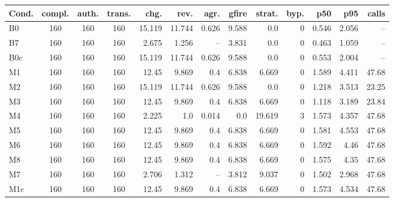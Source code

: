 \begin{tabular}{lcccrrrrrrrrr}
\toprule
Cond. & compl. & auth. & trans. & chg. & rev. & agr. & gfire & strat. & byp. & p50 & p95 & calls\\
\midrule
B0 & 160 & 160 & 160 & 15.119 & 11.744 & 0.626 & 9.588 & 0.0 & 0 & 0.546 & 2.056 & -- \\
B7 & 160 & 160 & 160 & 2.675 & 1.256 & -- & 3.831 & 0.0 & 0 & 0.463 & 1.059 & -- \\
B0c & 160 & 160 & 160 & 15.119 & 11.744 & 0.626 & 9.588 & 0.0 & 0 & 0.553 & 2.004 & -- \\
M1 & 160 & 160 & 160 & 12.45 & 9.869 & 0.4 & 6.838 & 6.669 & 0 & 1.589 & 4.411 & 47.68 \\
M2 & 160 & 160 & 160 & 15.119 & 11.744 & 0.626 & 9.588 & 0.0 & 0 & 1.218 & 3.513 & 23.25 \\
M3 & 160 & 160 & 160 & 12.45 & 9.869 & 0.4 & 6.838 & 6.669 & 0 & 1.118 & 3.189 & 23.84 \\
M4 & 160 & 160 & 160 & 2.225 & 1.0 & 0.014 & 0.0 & 19.619 & 3 & 1.573 & 4.357 & 47.68 \\
M5 & 160 & 160 & 160 & 12.45 & 9.869 & 0.4 & 6.838 & 6.669 & 0 & 1.581 & 4.553 & 47.68 \\
M6 & 160 & 160 & 160 & 12.45 & 9.869 & 0.4 & 6.838 & 6.669 & 0 & 1.592 & 4.46 & 47.68 \\
M8 & 160 & 160 & 160 & 12.45 & 9.869 & 0.4 & 6.838 & 6.669 & 0 & 1.575 & 4.35 & 47.68 \\
M7 & 160 & 160 & 160 & 2.706 & 1.312 & -- & 3.812 & 9.037 & 0 & 1.502 & 2.968 & 47.68 \\
M1c & 160 & 160 & 160 & 12.45 & 9.869 & 0.4 & 6.838 & 6.669 & 0 & 1.573 & 4.534 & 47.68 \\
\bottomrule
\end{tabular}
